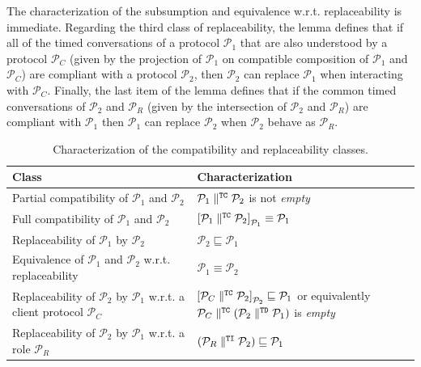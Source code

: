 The characterization of the subsumption and equivalence w.r.t. replaceability is immediate. Regarding the third class of replaceability, the lemma defines that if all of the timed conversations of a protocol $\mathcal{P}_1$ that are also understood by a protocol $\mathcal{P}_C$ (given by the projection of $\mathcal{P}_1$ on compatible composition of $\mathcal{P}_1$ and $\mathcal{P}_C$) are compliant with a protocol $\mathcal{P}_2$, then $\mathcal{P}_2$ can replace $\mathcal{P}_1$ when interacting with $\mathcal{P}_C$. Finally, the last item of the lemma defines that if the common timed conversations of $\mathcal{P}_2$ and $\mathcal{P}_R$ (given by the intersection of $\mathcal{P}_2$ and $\mathcal{P}_R$) are compliant with $\mathcal{P}_1$ then $\mathcal{P}_1$ can replace $\mathcal{P}_2$ when  $\mathcal{P}_2$ behave as $\mathcal{P}_R$.\\

\begin{table}[tbhp]
  \footnotesize
  \begin{center}
  \begin{tabular}{|p{}|p{}|}
    
    \hline
    
    \textbf{Class} & \textbf{Characterization}
    \\ \hline
    
    Partial compatibility of $\mathcal{P}_1$ and $\mathcal{P}_2$ &
    $\mathcal{P}_1 \parallel^{\mathtt{TC}} \mathcal{P}_2$ is not \emph{empty}
    \\ \hline
    
    Full compatibility of $\mathcal{P}_1$ and $\mathcal{P}_2$ &
    $\left[ \mathcal{P}_1 \parallel^{\mathtt{TC}} \mathcal{P}_2 \right]_{\mathcal{P}_1} \equiv \mathcal{P}_1$
    \\ \hline
    
    Replaceability of $\mathcal{P}_1$ by $\mathcal{P}_2$ &
    $\mathcal{P}_2 \sqsubseteq \mathcal{P}_1$
    \\ \hline
    
    Equivalence of $\mathcal{P}_1$ and $\mathcal{P}_2$ w.r.t. replaceability &
    $\mathcal{P}_1 \equiv \mathcal{P}_2$
    \\ \hline
    
    Replaceability of $\mathcal{P}_2$ by $\mathcal{P}_1$ w.r.t. a client protocol $\mathcal{P}_C$ &
    $\left[ \mathcal{P}_C \parallel^{\mathtt{TC}} \mathcal{P}_2 \right]_{\mathcal{P}_2} \sqsubseteq \mathcal{P}_1$ or equivalently
    $\mathcal{P}_C \parallel^{\mathtt{TC}} (\mathcal{P}_2 \parallel^{\mathtt{TD}} \mathcal{P}_1)$ is \emph{empty}
    \\ \hline
    
    Replaceability of $\mathcal{P}_2$ by $\mathcal{P}_1$ w.r.t. a role $\mathcal{P}_R$ &
    $(\mathcal{P}_R \parallel^{\mathtt{TI}} \mathcal{P}_2) \sqsubseteq \mathcal{P}_1$
    \\ \hline
    
  \end{tabular}
  \end{center}
  \caption{Characterization of the compatibility and replaceability classes.}
  \label{tab:classes-characterization}
\end{table}

